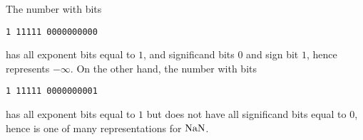 \begin{example} The number with bits

\begin{verbatim}
1 11111 0000000000
\end{verbatim}
has all exponent bits equal to $1$, and significand bits $0$ and sign bit $1$, hence represents $-\ensuremath{\infty}$. On the other hand, the number with bits

\begin{verbatim}
1 11111 0000000001
\end{verbatim}
has all exponent bits equal to $1$ but does not have all significand bits equal to $0$, hence is one of many representations for  ${\rm NaN}$. \end{example}



